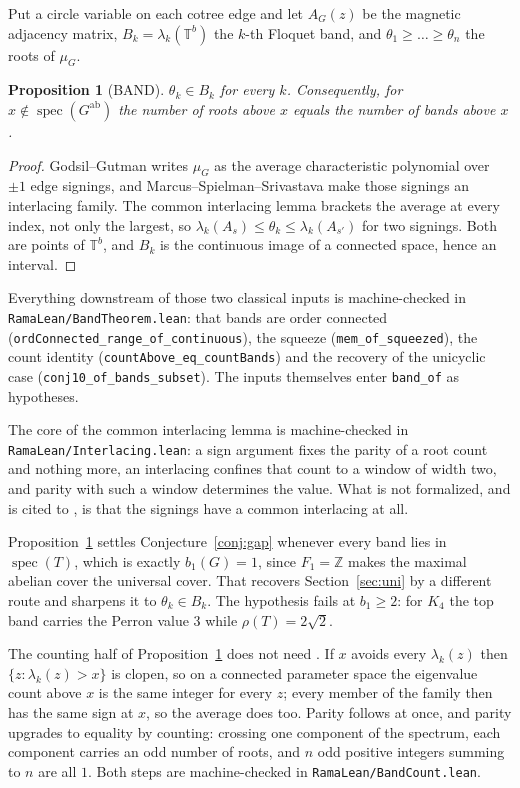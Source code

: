\documentclass[11pt]{article}
\newtheorem{proposition}[theorem]{Proposition}
\theoremstyle{remark}
\begin{document}
Put a circle variable on each cotree edge and let $A_G(z)$ be the magnetic adjacency matrix,
$B_k=\lambda_k(\mathbb T^b)$ the $k$-th Floquet band, and $\theta_1\ge\dots\ge\theta_n$ the
roots of $\mu_G$.

\begin{proposition}[BAND]\label{prop:band}
$\theta_k\in B_k$ for every $k$. Consequently, for $x\notin\operatorname{spec}(G^{\mathrm{ab}})$
the number of roots above $x$ equals the number of bands above $x$.
\end{proposition}

\begin{proof}
Godsil--Gutman writes $\mu_G$ as the average characteristic polynomial over $\pm1$ edge
signings, and Marcus--Spielman--Srivastava \cite{MSS} make those signings an interlacing
family. The common interlacing lemma brackets the average at every index, not only the
largest, so $\lambda_k(A_s)\le\theta_k\le\lambda_k(A_{s'})$ for two signings. Both are points
of $\mathbb T^b$, and $B_k$ is the continuous image of a connected space, hence an interval.
\end{proof}

Everything downstream of those two classical inputs is machine-checked in
\texttt{RamaLean/BandTheorem.lean}: that bands are order connected
(\texttt{ordConnected\_range\_of\_continuous}), the squeeze
(\texttt{mem\_of\_squeezed}), the count identity (\texttt{countAbove\_eq\_countBands}) and
the recovery of the unicyclic case (\texttt{conj10\_of\_bands\_subset}). The inputs
themselves enter \texttt{band\_of} as hypotheses.

The core of the common interlacing lemma is machine-checked in
\texttt{RamaLean/Interlacing.lean}: a sign argument fixes the parity of a root count and
nothing more, an interlacing confines that count to a window of width two, and parity with
such a window determines the value. What is not formalized, and is cited to \cite{MSS}, is
that the signings have a common interlacing at all.

Proposition~\ref{prop:band} settles Conjecture~\ref{conj:gap} whenever every band lies in
$\operatorname{spec}(T)$, which is exactly $b_1(G)=1$, since $F_1=\mathbb{Z}$ makes the maximal
abelian cover the universal cover. That recovers Section~\ref{sec:uni} by a different route
and sharpens it to $\theta_k\in B_k$. The hypothesis fails at $b_1\ge2$: for $K_4$ the top
band carries the Perron value $3$ while $\rho(T)=2\sqrt2$.

The counting half of Proposition~\ref{prop:band} does not need \cite{MSS}. If $x$ avoids
every $\lambda_k(z)$ then $\{z:\lambda_k(z)>x\}$ is clopen, so on a connected parameter space
the eigenvalue count above $x$ is the same integer for every $z$; every member of the family
then has the same sign at $x$, so the average does too. Parity follows at once, and parity
upgrades to equality by counting: crossing one component of the spectrum, each component
carries an odd number of roots, and $n$ odd positive integers summing to $n$ are all $1$.
Both steps are machine-checked in \texttt{RamaLean/BandCount.lean}.
\end{document}
